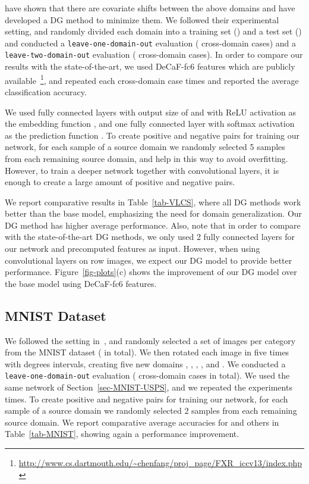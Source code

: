 \cite{ghifary2015domain,ghifary2016scatter} have shown that there are covariate shifts between the above  domains and have developed a DG method to minimize them. We followed their experimental setting, and randomly divided each domain into a training set () and a test set () and conducted a {\tt leave-one-domain-out} evaluation ( cross-domain cases) and a {\tt leave-two-domain-out} evaluation ( cross-domain cases). In order to compare our results with the state-of-the-art, we used DeCaF-fc6 features which are publicly available~\footnote{\url{http://www.cs.dartmouth.edu/~chenfang/proj_page/FXR_iccv13/index.php}}, and repeated each cross-domain case  times and reported the average classification accuracy.

We used  fully connected layers with output size of  and  with ReLU activation as the embedding function , and one fully connected layer with softmax activation as the prediction function .
To create positive and negative pairs for training our network, for each sample of a source domain we randomly selected 5 samples from each remaining source domain, and help in this way to avoid overfitting. However, to train a deeper network together with convolutional layers, it is enough to create a large amount of positive and negative pairs.


We report comparative results in Table~\ref{tab-VLCS}, where all DG methods work better than the base model, emphasizing the need for domain generalization. Our DG method has higher average performance. Also, note that in order to compare with the state-of-the-art DG methods, we only used 2 fully connected layers for our network and precomputed features as input. However, when using convolutional layers on row images, we expect our DG model to provide better performance. Figure~\ref{fig-plots}(c) shows the improvement of our DG model over the base model using DeCaF-fc6 features.

\subsection{MNIST Dataset}
We followed the setting in~\cite{ghifary2015domain}, and randomly selected a set  of  images per category from the MNIST dataset ( in total). We then rotated each image in  five times with  degrees intervals, creating five new domains , , , , and . We conducted a {\tt leave-one-domain-out} evaluation ( cross-domain cases in total). We used the same network of Section~\ref{sec-MNIST-USPS}, and we repeated the experiments  times. To create positive and
negative pairs for training our network, for each sample of a
source domain we randomly selected 2 samples from each
remaining source domain. We report comparative average accuracies for \modelGA and others in Table~\ref{tab-MNIST}, showing again a performance improvement.


